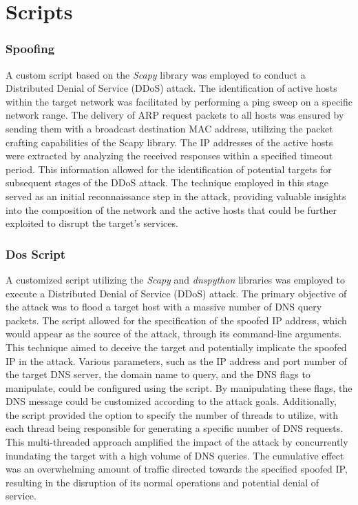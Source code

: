 \section{Scripts}
\subsubsection*{Spoofing}
A custom script based on the \textit{Scapy} library was employed to conduct a Distributed Denial of Service (DDoS) attack.
The identification of active hosts within the target network was facilitated by performing a ping sweep on a specific network range.
The delivery of ARP request packets to all hosts was ensured by sending them with a broadcast destination MAC address,
utilizing the packet crafting capabilities of the Scapy library.
The IP addresses of the active hosts were extracted by analyzing the received responses within a specified timeout period.
This information allowed for the identification of potential targets for subsequent stages of the DDoS attack.
The technique employed in this stage served as an initial reconnaissance step in the attack, providing valuable insights
into the composition of the network and the active hosts that could be further exploited to disrupt the target's services.

\subsubsection*{Dos Script}
A customized script utilizing the \textit{Scapy} and \textit{dnspython} libraries was employed to execute a Distributed Denial of Service (DDoS) attack.
The primary objective of the attack was to flood a target host with a massive number of DNS query packets. The script allowed for the specification
of the spoofed IP address, which would appear as the source of the attack, through its command-line arguments.
This technique aimed to deceive the target and potentially implicate the spoofed IP in the attack.
Various parameters, such as the IP address and port number of the target DNS server, the domain name to query,
and the DNS flags to manipulate, could be configured using the script.
By manipulating these flags, the DNS message could be customized according to the attack goals.
Additionally, the script provided the option to specify the number of threads to utilize,
with each thread being responsible for generating a specific number of DNS requests.
This multi-threaded approach amplified the impact of the attack by concurrently inundating the target with a high volume of DNS queries.
The cumulative effect was an overwhelming amount of traffic directed towards the specified spoofed IP,
resulting in the disruption of its normal operations and potential denial of service.